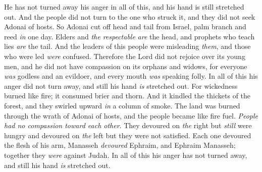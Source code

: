 \begin{biblechapter}
He has not turned away his anger in all of this, 
and his hand is still stretched out.
\verse And the people did not turn to the one who struck it, 
and they did not seek Adonai of hosts.
\verse So Adonai cut off head and tail from Israel, 
palm branch and reed \textit{in} one day.
\verse Elders and \textit{the respectable} \textit{are} the head, 
and prophets who teach lies \textit{are} the tail.
\verse And the leaders of this people were misleading \textit{them}, 
and those who were led \textit{were} confused.
\verse Therefore the Lord did not rejoice over its young men, 
and he did not have compassion on its orphans and widows, 
for everyone \textit{was} godless and an evildoer, 
and every mouth \textit{was} speaking folly. 
In all of this his anger did not turn away, 
and still his hand \textit{is} stretched out.
\verse For wickedness burned like fire; 
it consumed brier and thorn. 
And it kindled the thickets of the forest, 
and they swirled upward \textit{in} a column of smoke.
\verse The land was burned through the wrath of Adonai of hosts, 
and the people became like fire fuel. 
\textit{People had no compassion toward each other}.
\verse They devoured on \textit{the} right but \textit{still} were hungry 
and devoured on \textit{the} left but they were not satisfied. 
Each one devoured the flesh of his arm,
\verse Manasseh \textit{devoured} Ephraim, and Ephraim Manasseh; 
together they \textit{were} against Judah. 
In all of this his anger has not turned away, 
and still his hand \textit{is} stretched out.
\end{biblechapter}

